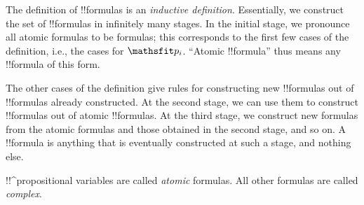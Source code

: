 \documentclass[../../../include/open-logic-section]{subfiles}
\begin{document}
\begin{explain}
The definition of !!{formula}s is an
\emph{inductive definition}.  Essentially, we construct the set of
!!{formula}s in infinitely many stages.  In the initial stage, we
pronounce all atomic formulas to be formulas; this corresponds to the
first few cases of the definition, i.e., the cases for
%
%
$\Obj p_i$.  ``Atomic !!{formula}''
thus means any !!{formula} of this form.

The other cases of the definition give rules for constructing new
!!{formula}s out of !!{formula}s already constructed.  At the second
stage, we can use them to construct !!{formula}s out of atomic
!!{formula}s.  At the third stage, we construct new formulas from the
atomic formulas and those obtained in the second stage, and so on.  A
!!{formula} is anything that is eventually constructed at such a
stage, and nothing else.
\end{explain}

\begin{defn}
 !!^{propositional variable}s  are called \emph{atomic} formulas.
All other formulas are called \emph{complex}.

\end{defn}
\end{document}
